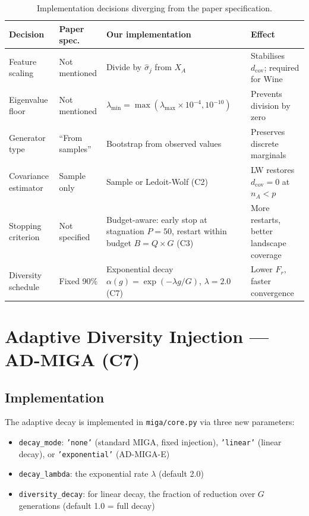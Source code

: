 \begin{table}[h]
\caption{Implementation decisions diverging from the paper specification.}
\label{tab:decisions}
\centering
\begin{tabular}{p{2.5cm}p{2.8cm}p{5.8cm}p{2.2cm}}
\toprule
\textbf{Decision} & \textbf{Paper spec.} & \textbf{Our implementation} & \textbf{Effect} \\
\midrule
Feature scaling       & Not mentioned  & Divide by $\hat{\sigma}_j$ from $X_A$ & Stabilises $d_{\text{cov}}$; required for Wine \\
Eigenvalue floor      & Not mentioned  & $\lambda_{\min} = \max(\lambda_{\max} \times 10^{-4}, 10^{-10})$ & Prevents division by zero \\
Generator type        & ``From samples'' & Bootstrap from observed values & Preserves discrete marginals \\
Covariance estimator  & Sample only    & Sample or Ledoit-Wolf (C2) & LW restores $d_{\text{cov}}=0$ at $n_A < p$ \\
Stopping criterion    & Not specified  & Budget-aware: early stop at stagnation $P=50$, restart within budget $B=Q \times G$ (C3) & More restarts, better landscape coverage \\
Diversity schedule    & Fixed 90\%     & Exponential decay $\alpha(g)=\exp(-\lambda g/G)$, $\lambda=2.0$ (C7) & Lower $F_r$, faster convergence \\
\bottomrule
\end{tabular}
\end{table}


\section{Adaptive Diversity Injection --- AD-MIGA (C7)}
\label{sec:ad_miga_impl}

\subsection{Implementation}

The adaptive decay is implemented in \texttt{miga/core.py} via three new parameters:

\begin{itemize}
    \item \texttt{decay\_mode}: \texttt{'none'} (standard MIGA, fixed injection), \texttt{'linear'} (linear decay), or \texttt{'exponential'} (AD-MIGA-E)
    \item \texttt{decay\_lambda}: the exponential rate $\lambda$ (default 2.0)
    \item \texttt{diversity\_decay}: for linear decay, the fraction of reduction over $G$ generations (default 1.0 = full decay)
\end{itemize}

